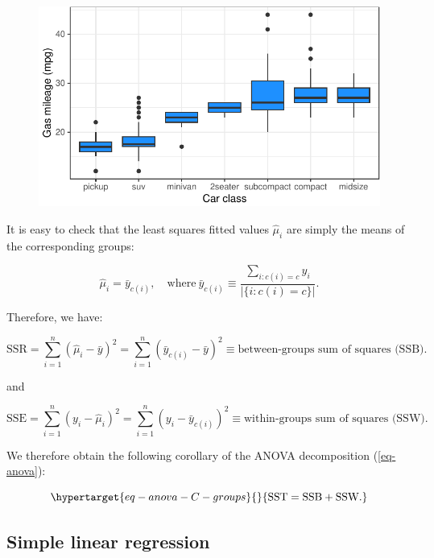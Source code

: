 \documentclass[
  11pt,
  letterpaper,
  oneside]{book}
\theoremstyle{definition}
\theoremstyle{plain}
\theoremstyle{plain}
\theoremstyle{plain}
\theoremstyle{remark}
\begin{document}
\begin{figure}[H]

{\centering \includegraphics{anova_files/figure-pdf/unnamed-chunk-2-1.pdf}

}

\end{figure}

It is easy to check that the least squares fitted values
\(\widehat{\mu}_i\) are simply the means of the corresponding groups:

\[
\widehat{\mu}_i = \bar{y}_{c(i)}, \quad \text{where}\ \bar{y}_{c(i)} \equiv \frac{\sum_{i: c(i) = c} y_i}{|\{i: c(i) = c\}|}.
\]

Therefore, we have:

\[
\text{SSR} = \sum_{i = 1}^n (\widehat{\mu}_i - \bar{y})^2 = \sum_{i = 1}^n (\bar{y}_{c(i)} - \bar{y})^2 \equiv \text{between-groups sum of squares (SSB)}.
\]

and

\[
\text{SSE} = \sum_{i = 1}^n (y_i - \widehat{\mu}_i)^2 = \sum_{i = 1}^n (y_i - \bar{y}_{c(i)})^2 \equiv \text{within-groups sum of squares (SSW)}.
\]

We therefore obtain the following corollary of the ANOVA decomposition
(\ref{eq-anova}):

\begin{equation}\protect\hypertarget{eq-anova-C-groups}{}{
\text{SST} = \text{SSB} + \text{SSW}.
}\label{eq-anova-C-groups}\end{equation}

\hypertarget{simple-linear-regression}{%
\subsection{Simple linear regression}\label{simple-linear-regression}}
\end{document}
